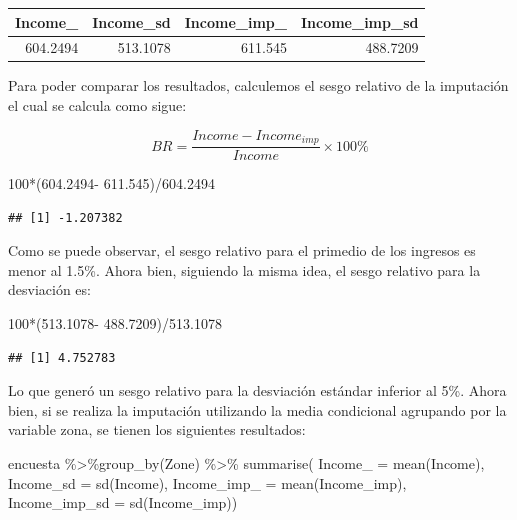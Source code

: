 \documentclass[
  12pt,
]{book}
\newenvironment{Shaded}{\begin{snugshade}}{\end{snugshade}}
\newcommand{\AttributeTok}[1]{\textcolor[rgb]{0.77,0.63,0.00}{#1}}
\newcommand{\DecValTok}[1]{\textcolor[rgb]{0.00,0.00,0.81}{#1}}
\newcommand{\FloatTok}[1]{\textcolor[rgb]{0.00,0.00,0.81}{#1}}
\newcommand{\FunctionTok}[1]{\textcolor[rgb]{0.00,0.00,0.00}{#1}}
\newcommand{\NormalTok}[1]{#1}
\newcommand{\SpecialCharTok}[1]{\textcolor[rgb]{0.00,0.00,0.00}{#1}}
\begin{document}
\begin{tabular}{r|r|r|r}
\hline
Income\_ & Income\_sd & Income\_imp\_ & Income\_imp\_sd\\
\hline
604.2494 & 513.1078 & 611.545 & 488.7209\\
\hline
\end{tabular}

Para poder comparar los resultados, calculemos el sesgo relativo de la imputación el cual se calcula como sigue:

\[
BR=\frac{Income-Income_{imp}}{Income}\times100\%
\]

\begin{Shaded}
\begin{Highlighting}[]
\DecValTok{100}\SpecialCharTok{*}\NormalTok{(}\FloatTok{604.2494}\SpecialCharTok{{-}} \FloatTok{611.545}\NormalTok{)}\SpecialCharTok{/}\FloatTok{604.2494}
\end{Highlighting}
\end{Shaded}

\begin{verbatim}
## [1] -1.207382
\end{verbatim}

Como se puede observar, el sesgo relativo para el primedio de los ingresos es menor al 1.5\%. Ahora bien, siguiendo la misma idea, el sesgo relativo para la desviación es:

\begin{Shaded}
\begin{Highlighting}[]
\DecValTok{100}\SpecialCharTok{*}\NormalTok{(}\FloatTok{513.1078}\SpecialCharTok{{-}} \FloatTok{488.7209}\NormalTok{)}\SpecialCharTok{/}\FloatTok{513.1078}
\end{Highlighting}
\end{Shaded}

\begin{verbatim}
## [1] 4.752783
\end{verbatim}

Lo que generó un sesgo relativo para la desviación estándar inferior al 5\%. Ahora bien, si se realiza la imputación utilizando la media condicional agrupando por la variable zona, se tienen los siguientes resultados:

\begin{Shaded}
\begin{Highlighting}[]
\NormalTok{encuesta }\SpecialCharTok{\%\textgreater{}\%}\FunctionTok{group\_by}\NormalTok{(Zone) }\SpecialCharTok{\%\textgreater{}\%}  \FunctionTok{summarise}\NormalTok{(}
  \AttributeTok{Income\_ =} \FunctionTok{mean}\NormalTok{(Income),}
  \AttributeTok{Income\_sd =} \FunctionTok{sd}\NormalTok{(Income),}
  \AttributeTok{Income\_imp\_ =} \FunctionTok{mean}\NormalTok{(Income\_imp),}
  \AttributeTok{Income\_imp\_sd =} \FunctionTok{sd}\NormalTok{(Income\_imp))}
\end{Highlighting}
\end{Shaded}
\end{document}
